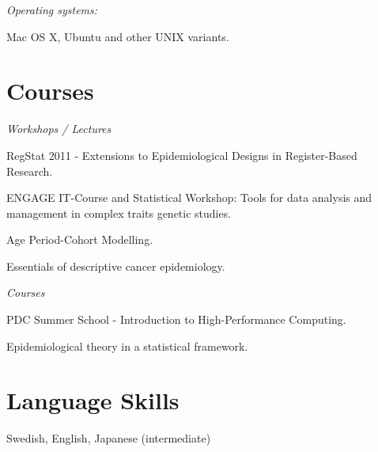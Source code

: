 \halfblankline

\textit{Operating systems:}
\begin{innerlist}
    \item Mac OS X, Ubuntu and other UNIX variants.
\end{innerlist}


%
%
\section{Courses}
\textit{Workshops / Lectures}
\begin{innerlist}
    \item RegStat 2011 - Extensions to Epidemiological Designs in Register-Based Research.
    \item ENGAGE IT-Course and Statistical Workshop: Tools for data analysis and management in complex traits genetic studies.
    \item Age Period-Cohort Modelling.
    \item Essentials of descriptive cancer epidemiology.
\end{innerlist}

\halfblankline

\textit{Courses}
\begin{innerlist}
    \item PDC Summer School - Introduction to High-Performance Computing.
    \item Epidemiological theory in a statistical framework.
\end{innerlist}


%
%
\section{Language Skills}
Swedish, English, Japanese (intermediate)
